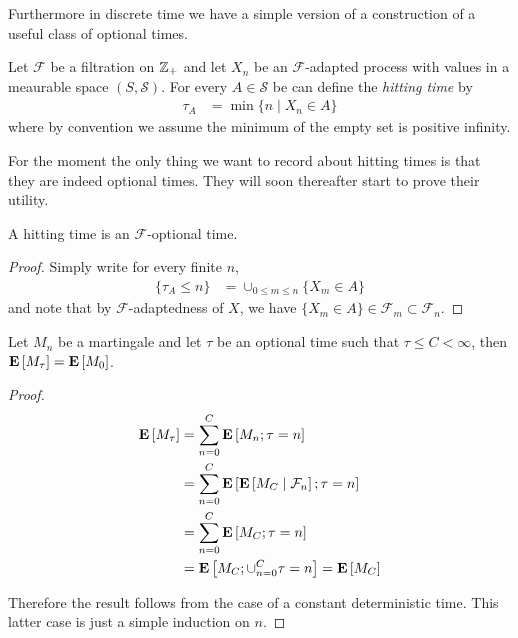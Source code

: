 Furthermore in discrete time we have a simple version of a
construction of a useful class of optional times.
\begin{defn}Let $\mathcal{F}$ be a filtration on $\integers_+$ and let
  $X_n$ be an $\mathcal{F}$-adapted process with values in a meaurable
  space $(S, \mathcal{S})$.  For every $A \in \mathcal{S}$ be can
  define the \emph{hitting time} by
\begin{align*}
\tau_A &= \min \lbrace n \mid X_n \in A \rbrace
\end{align*}
where by convention we assume the minimum of the empty set is positive infinity.
\end{defn}

For the moment the only thing we want to record about hitting times is
that they are indeed optional times.  They will soon thereafter start to prove their utility.
\begin{lem}\label{HittingTimesDiscrete}A hitting time is an
  $\mathcal{F}$-optional time.
\end{lem}
\begin{proof}
Simply write for every finite $n$,
\begin{align*}
\lbrace \tau_A \leq n \rbrace &= \cup_{0 \leq m \leq n} \lbrace X_m
\in A \rbrace
\end{align*}
and note that by $\mathcal{F}$-adaptedness of $X$, we have $\lbrace X_m
\in A \rbrace \in \mathcal{F}_m \subset \mathcal{F}_n$.
\end{proof}

\begin{lem}\label{ExpectationStoppedMartingaleDiscrete}Let $M_n$ be a martingale and let $\tau$ be an optional
  time such that $\tau \leq C < \infty$, then $\expectation{M_\tau} =
  \expectation{M_0}$.
\end{lem}
\begin{proof}
\begin{align*}
\expectation{M_\tau} &= \sum_{n=0}^C \expectation{M_n ; \tau=n} \\
&=\sum_{n=0}^C \expectation{\cexpectationlong{\mathcal{F}_n}{M_C} ;
  \tau=n} \\
&=\sum_{n=0}^C \expectation{M_C ;
  \tau=n} \\
&=\expectation{M_C ;
  \cup_{n=0}^C \tau=n} = \expectation{M_C}\\
\end{align*}

Therefore the result follows from the case of a constant deterministic
time.  This latter case is just a simple induction on $n$.
\end{proof}


